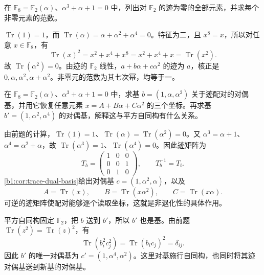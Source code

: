 \begin{exercise}\label{b1:ex:18-trace-eight}
	在 \(\mathbb F_8=\mathbb F_2(\alpha)\)、\(\alpha^3+\alpha+1=0\) 中，列出对 \(\mathbb F_2\) 的迹为零的全部元素，并求每个非零元素的范数。
\end{exercise}
\begin{solution}
	\(\operatorname{Tr}(1)=1\)，而 \(\operatorname{Tr}(\alpha)=\alpha+\alpha^2+\alpha^4=0\)。特征为二，且 \(x^8=x\)，所以对任意 \(x\in\mathbb F_8\)，有
	\[
		\operatorname{Tr}(x)^2=x^2+x^4+x^8 =x^2+x^4+x=\operatorname{Tr}(x^2).
	\]
	故 \(\operatorname{Tr}(\alpha^2)=0\)。由迹的 \(\mathbb F_2\) 线性，\(a+b\alpha+c\alpha^2\) 的迹为 \(a\)，核正是 \(0,\alpha,\alpha^2,\alpha+\alpha^2\)。非零元的范数为其七次幂，均等于一。
\end{solution}

\begin{exercise}\label{b1:ex:18-trace-dual-basis}
	在 \(\mathbb F_8=\mathbb F_2(\alpha)\)、\(\alpha^3+\alpha+1=0\) 中，求基 \(b=(1,\alpha,\alpha^2)\) 关于迹配对的对偶基，并用它恢复任意元素 \(x=A+B\alpha+C\alpha^2\) 的三个坐标。再求基 \(b'=(1,\alpha^2,\alpha^4)\) 的对偶基，解释这与平方自同构有什么关系。
\end{exercise}
\begin{solution}
	由前题的计算，\(\operatorname{Tr}(1)=1\)、\(\operatorname{Tr}(\alpha)=\operatorname{Tr}(\alpha^2)=0\)。又 \(\alpha^3=\alpha+1\)、\(\alpha^4=\alpha^2+\alpha\)，故 \(\operatorname{Tr}(\alpha^3)=1\)、\(\operatorname{Tr}(\alpha^4)=0\)。因此迹矩阵为
	\[
		T_b=\begin{pmatrix}1&0&0\\0&0&1\\0&1&0\end{pmatrix},\qquad T_b^{-1}=T_b.
	\]
	\cref{b1:cor:trace-dual-basis}给出对偶基 \(c=(1,\alpha^2,\alpha)\)，以及
	\[
		A=\operatorname{Tr}(x),\qquad B=\operatorname{Tr}(x\alpha^2),\qquad C=\operatorname{Tr}(x\alpha).
	\]
	可逆的迹矩阵使配对能够逐个读取坐标，这就是非退化性的具体作用。

	平方自同构固定 \(\mathbb F_2\)，把 \(b\) 送到 \(b'\)，所以 \(b'\) 也是基。由前题 \(\operatorname{Tr}(z^2)=\operatorname{Tr}(z)^2\)，有
	\[
		\operatorname{Tr}(b_i^2c_j^2)=\operatorname{Tr}(b_ic_j)^2=\delta_{ij}.
	\]
	因此 \(b'\) 的唯一对偶基为 \(c'=(1,\alpha^4,\alpha^2)\)。这里对基施行自同构，也同时将其迹对偶基送到新基的对偶基。
\end{solution}

